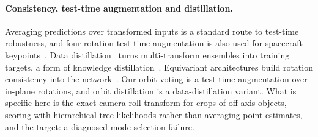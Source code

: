 \paragraph{Consistency, test-time augmentation and distillation.}
Averaging predictions over transformed inputs is a standard route to test-time robustness, and four-rotation test-time augmentation is also used for spacecraft keypoints~\cite{church2026vfm}. Data distillation~\cite{radosavovic2018data} turns multi-transform ensembles into training targets, a form of knowledge distillation~\cite{hinton2015distilling}. Equivariant architectures build rotation consistency into the network~\cite{klee2023image2sphere}. Our orbit voting is a test-time augmentation over in-plane rotations, and orbit distillation is a data-distillation variant. What is specific here is the exact camera-roll transform for crops of off-axis objects, scoring with hierarchical tree likelihoods rather than averaging point estimates, and the target: a diagnosed mode-selection failure.
